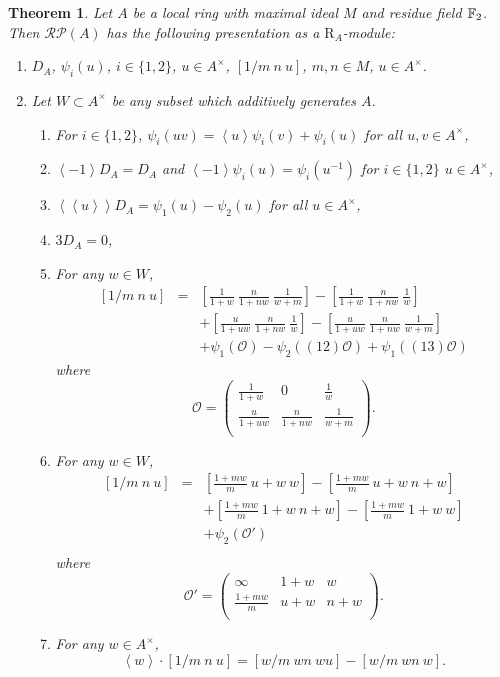 \documentclass[12pt]{amsart}
\newtheorem{thm}[lem]{Theorem}
\theoremstyle{definition}
\newcommand{\F}[1]{\Bbb{F}_{#1}}
\newcommand{\oct}{\mathcal{O}}%
\newcommand{\scyc}[1]{\left[ #1 \right]} %
\newcommand{\rpb}[1]{\mathcal{RP}(#1)}%
\newcommand{\suss}[2]{\psi_{#1}\left( #2\right)}
\newcommand{\cconst}[1]{D_{#1}}
\newcommand{\<}{\langle}
\renewcommand{\>}{\rangle}
\newcommand{\sgr}[1]{\mathrm{R}_{#1}}%
\newcommand{\an}[1]{\left\langle{#1}\right\rangle}
\newcommand{\pf}[1]{\left\langle\!\left\langle{#1}\right\rangle\!\right\rangle}
\begin{document}
\begin{thm}\label{thm:rpaf2} Let $A$ be a local ring with maximal ideal $M$ and residue field $\F{2}$. Then $\rpb{A}$ has the following presentation as a $\sgr{A}$-module:
\begin{enumerate}
\item[Generators:]

$\cconst{A}$, $\suss{i}{u}$, $i\in \{ 1,2\}$, $u\in A^\times$, $\scyc{ 1/m\ n\  u}$, $m,n\in M$, $u\in A^\times$.

\item[Relations:]  Let $W\subset A^\times$ be any subset which additively generates $A$.
\begin{enumerate}
\item For $i\in \{ 1,2\}$, $\suss{i}{uv}=\an{u}\suss{i}{v}+\suss{i}{u}$ for all $u,v\in A^\times$,
\item $\an{-1}\cconst{A}=\cconst{A}$ and $\an{-1}\suss{i}{u}=\suss{i}{u^{-1}}$ for $i\in \{ 1,2\}$ $u\in A^\times$,
\item $\pf{u}\cconst{A}=\suss{1}{u}-\suss{2}{u}$ for all $u\in A^\times$,
\item $3\cconst{A}=0$,
\item For any $w\in W$,
\begin{eqnarray*}
\scyc{ 1/m\  n\ u}&=& \scyc{\frac{1}{1+w}\ \frac{n}{1+nw}\ \frac{1}{w+m}}-\scyc{\frac{1}{1+w}\ \frac{n}{1+nw}\ \frac{1}{w}} \\
&&+\scyc{\frac{u}{1+uw}\ \frac{n}{1+nw}\ \frac{1}{w}}-\scyc{\frac{u}{1+uw}\ \frac{n}{1+nw}\ \frac{1}{w+m}}\\
&&+\suss{1}{\oct}-\suss{2}{(12)\oct}+\suss{1}{(13)\oct}
\end{eqnarray*}
where 
\[
\oct=\left(
\begin{array}{lll}
\frac{1}{1+w}& 0&\frac{1}{w}\\
\frac{u}{1+uw}&\frac{n}{1+nw}&\frac{1}{w+m}\\
\end{array}
\right).
\]
\item For any $w\in W$,
\begin{eqnarray*}
 \scyc{ 1/m\  n\ u}&=&    \scyc{\frac{1+mw}{m}\ u+w\ w}-\scyc{\frac{1+mw}{m}\ u+w\ n+w} \\
&&+\scyc{\frac{1+mw}{m}\ 1+w\ n+w}-\scyc{\frac{1+mw}{m}\ 1+w\ w}\\    
&&+\suss{2}{\oct'}\\
\end{eqnarray*}
where 
\[
\oct'=\left(
\begin{array}{lll}
\infty& 1+w&{w}\\
\frac{1+mw}{m}&u+w&{n+w}\\
\end{array}
\right).
\]
\item For any $w\in A^\times$,
\[
\an{w}\cdot\scyc{ 1/m\  n\ u}=\scyc{w/m\ wn\ wu}-\scyc{ w/m\ wn\ w}.
\]
\end{enumerate}
\end{enumerate}
\end{thm}
\end{document}
